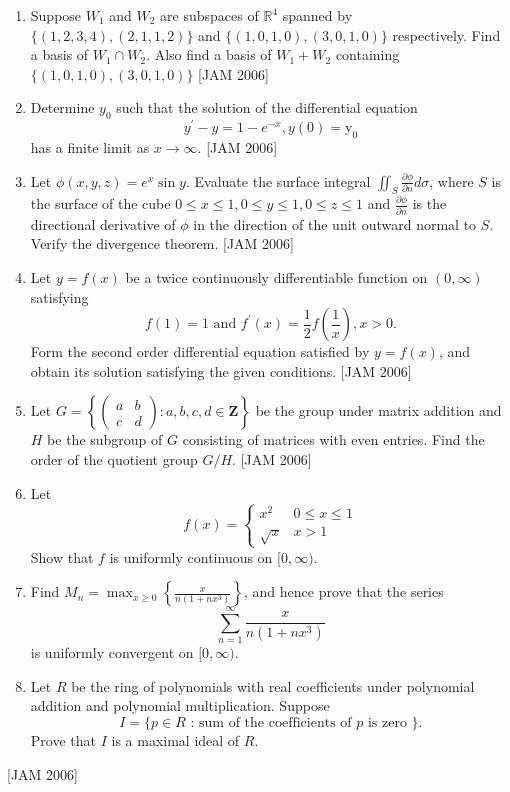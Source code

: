 \begin{enumerate}
\item  Suppose $W_{1}$ and $W_{2}$ are subspaces of $\mathbb{R}^{4}$ spanned by $\{(1,2,3,4),(2,1,1,2)\}$ and $\{(1,0,1,0),(3,0,1,0)\}$ respectively. Find a basis of $W_{1} \cap W_{2}$. Also find a basis of $W_{1}+W_{2}$ containing $\{(1,0,1,0),(3,0,1,0)\}$
 \hfill [JAM 2006]
 
  \item Determine $y_{0}$ such that the solution of the differential equation
$$
y^{\prime}-y=1-e^{-x}, y(0)=\mathrm{y}_{0}
$$
has a finite limit as $x \rightarrow \infty$.
 \hfill [JAM 2006]





  \item Let $\phi(x, y, z)=e^{x} \sin y$. Evaluate the surface integral $\iint_{S} \frac{\partial \phi}{\partial n} d \sigma$, where $S$ is the surface of the cube $0 \leq x \leq 1,0 \leq y \leq 1,0 \leq z \leq 1$ and $\frac{\partial \phi}{\partial n}$ is the directional derivative of $\phi$ in the direction of the unit outward normal to $S$. Verify the divergence theorem.
 \hfill [JAM 2006]

 
  \item Let $y=f(x)$ be a twice continuously differentiable function on $(0, \infty)$ satisfying
$$
f(1)=1 \text { and } f^{\prime}(x)=\frac{1}{2} f\left(\frac{1}{x}\right), x>0 .
$$
Form the second order differential equation satisfied by $y=f(x)$, and obtain its solution satisfying the given conditions.
 \hfill [JAM 2006]

  \item Let $G=\left\{\left(\begin{array}{ll}a & b \\ c & d\end{array}\right): a, b, c, d \in \mathbf{Z}\right\}$ be the group under matrix addition and $H$ be the subgroup of $G$ consisting of matrices with even entries. Find the order of the quotient group $G / H$.
   \hfill [JAM 2006]

  \item Let
$$
f(x)=\left\{\begin{array}{cc}
x^{2} & 0 \leq x \leq 1 \\
\sqrt{x} & x>1
\end{array}\right.
$$
Show that $f$ is uniformly continuous on $[0, \infty)$.




  \item Find $M_{n}=\max _{x \geq 0}\left\{\frac{x}{n\left(1+n x^{3}\right)}\right\}$, and hence prove that the series
$$
\sum_{n=1}^{\infty} \frac{x}{n\left(1+n x^{3}\right)}
$$
is uniformly convergent on $[0, \infty)$.


\item Let $R$ be the ring of polynomials with real coefficients under polynomial addition and polynomial multiplication. Suppose
$$
I=\{p \in R \text { : sum of the coefficients of } p \text { is zero }\} .
$$
Prove that $I$ is a maximal ideal of $R$.

\end{enumerate}
 \hfill [JAM 2006]





